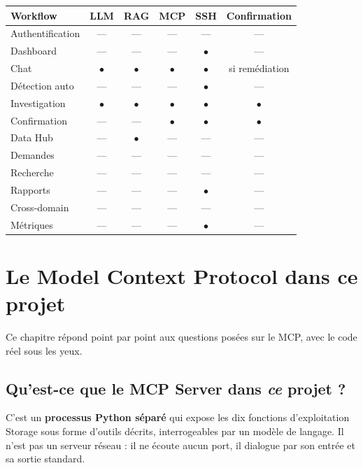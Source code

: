 \documentclass[11pt,a4paper]{report}
\begin{document}
\begin{longtable}{@{}p{3.6cm}ccccc@{}}
\toprule
\textbf{Workflow} & \textbf{LLM} & \textbf{RAG} & \textbf{MCP} & \textbf{SSH} & \textbf{Confirmation}\\
\midrule
\endhead
Authentification & --- & --- & --- & --- & ---\\
Dashboard & --- & --- & --- & \(\bullet\) & ---\\
Chat & \(\bullet\) & \(\bullet\) & \(\bullet\) & \(\bullet\) & si remédiation\\
Détection auto & --- & --- & --- & \(\bullet\) & ---\\
Investigation & \(\bullet\) & \(\bullet\) & \(\bullet\) & \(\bullet\) & \(\bullet\)\\
Confirmation & --- & --- & \(\bullet\) & \(\bullet\) & \(\bullet\)\\
Data Hub & --- & \(\bullet\) & --- & --- & ---\\
Demandes & --- & --- & --- & --- & ---\\
Recherche & --- & --- & --- & --- & ---\\
Rapports & --- & --- & --- & \(\bullet\) & ---\\
Cross-domain & --- & --- & --- & --- & ---\\
Métriques & --- & --- & --- & \(\bullet\) & ---\\
\bottomrule
\end{longtable}

\chapter{Le Model Context Protocol dans ce projet}
\label{ch:mcp}

Ce chapitre répond point par point aux questions posées sur le MCP, avec le
code réel sous les yeux.

\section{Qu'est-ce que le MCP Server dans \emph{ce} projet ?}

C'est un \textbf{processus Python séparé} qui expose les dix fonctions
d'exploitation Storage sous forme d'outils décrits, interrogeables par un modèle
de langage. Il n'est pas un serveur réseau : il ne écoute aucun port, il
dialogue par son entrée et sa sortie standard.
\end{document}
